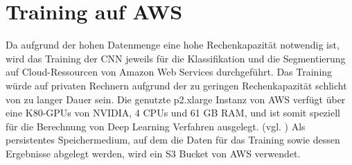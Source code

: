 \section{Training auf AWS}

Da aufgrund der hohen Datenmenge eine hohe Rechenkapazität notwendig ist, wird das Training der CNN jeweils für die Klassifikation und die Segmentierung auf Cloud-Ressourcen von Amazon Web Services durchgeführt. 
Das Training würde auf privaten Rechnern aufgrund der zu geringen Rechenkapazität schlicht von zu langer Dauer sein.
Die genutzte p2.xlarge Instanz von AWS verfügt über eine K80-GPUs von NVIDIA, 4 CPUs und 61 GB RAM, und ist somit speziell für die Berechnung von Deep Learning Verfahren ausgelegt.  (vgl. \cite{15}) 
Als persistentes Speichermedium, auf dem die Daten für das Training sowie dessen Ergebnisse abgelegt werden, wird ein S3 Bucket von AWS verwendet.